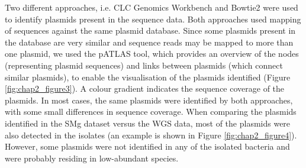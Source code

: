 Two different approaches, i.e. CLC Genomics Workbench and Bowtie2 were used to identify plasmids present in the sequence data. 
Both approaches used mapping of sequences against the same plasmid database. 
Since some plasmids present in the database are very similar and sequence reads may be mapped to more than one plasmid, we used the pATLAS tool, which provides an overview of the nodes (representing plasmid sequences) and links between plasmids (which connect similar plasmids), to enable the visualisation of the plasmids identified (Figure \ref{fig:chap2_figure3}). 
A colour gradient indicates the sequence coverage of the plasmids. 
In most cases, the same plasmids were identified by both approaches, with some small differences in sequence coverage. 
When comparing the plasmids identified in the SMg dataset versus the WGS data, most of the plasmids were also detected in the isolates (an example is shown in Figure \ref{fig:chap2_figure4}). 
However, some plasmids were not identified in any of the isolated bacteria and were probably residing in low-abundant species.

